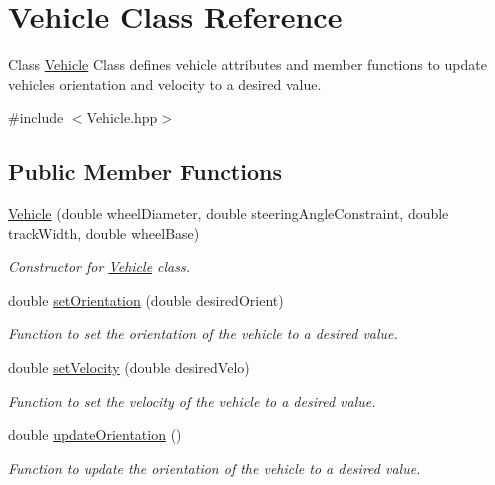 \hypertarget{classVehicle}{}\section{Vehicle Class Reference}
\label{classVehicle}


Class \mbox{\hyperlink{classVehicle}{Vehicle}} Class defines vehicle attributes and member functions to update vehicle\textquotesingle{}s orientation and velocity to a desired value.  




{\ttfamily \#include $<$Vehicle.\+hpp$>$}

\subsection*{Public Member Functions}
\begin{DoxyCompactItemize}
\item 
\mbox{\hyperlink{classVehicle_a28e612a4fb57d620a4a6dd85befb287b}{Vehicle}} (double wheel\+Diameter, double steering\+Angle\+Constraint, double track\+Width, double wheel\+Base)
\begin{DoxyCompactList}\small\item\em Constructor for \mbox{\hyperlink{classVehicle}{Vehicle}} class. \end{DoxyCompactList}\item 
double \mbox{\hyperlink{classVehicle_a865d9ec770da73501cb7b6ed75b2f9ca}{set\+Orientation}} (double desired\+Orient)
\begin{DoxyCompactList}\small\item\em Function to set the orientation of the vehicle to a desired value. \end{DoxyCompactList}\item 
double \mbox{\hyperlink{classVehicle_ad8f9151a22348bbfe3ff6e6a3df98f78}{set\+Velocity}} (double desired\+Velo)
\begin{DoxyCompactList}\small\item\em Function to set the velocity of the vehicle to a desired value. \end{DoxyCompactList}\item 
double \mbox{\hyperlink{classVehicle_aea71584dd54c085afb5c10250d393cd9}{update\+Orientation}} ()
\begin{DoxyCompactList}\small\item\em Function to update the orientation of the vehicle to a desired value. \end{DoxyCompactList}\item 

\end{DoxyCompactItemize}

